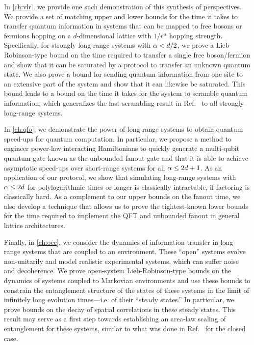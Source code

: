 In \cref{ch:vlr}, we provide one such demonstration of this synthesis of perspectives. We provide a set of matching upper and lower bounds for the time it takes to transfer quantum information in systems that can be mapped to free bosons or fermions hopping on a $d$-dimensional lattice with $1/r^{\alpha}$ hopping strength. Specifically, for strongly long-range systems with $\alpha < d/2$, we prove a Lieb-Robinson-type bound on the time required to transfer a single free boson/fermion and show that it can be saturated by a protocol to transfer an unknown quantum state. We also prove a bound for sending quantum information from one site to an extensive part of the system and show that it can likewise be saturated. This bound leads to a bound on the time it takes for the system to scramble quantum information, which generalizes the fast-scrambling result in Ref.~\cite{Lashkari2013} to all strongly long-range systems.

In \cref{ch:qfo}, we demonstrate the power of long-range systems to obtain quantum speed-ups for quantum computation. In particular, we propose a method to engineer power-law interacting Hamiltonians to quickly generate a multi-qubit quantum gate known as the unbounded fanout gate and that it is able to achieve asymptotic speed-ups over short-range systems for all $\alpha \le 2d+1$. As an application of our protocol, we show that simulating long-range systems with $\alpha \le 2d$ for polylogarithmic times or longer is classically intractable, if factoring is classically hard. As a complement to our upper bounds on the fanout time, we also develop a technique that allows us to prove the tightest-known lower bounds for the time required to implement the QFT and unbounded fanout in general lattice architectures.

Finally, in \cref{ch:occ}, we consider the dynamics of information transfer in long-range systems that are coupled to an environment. These ``open'' systems evolve non-unitarily and model realistic experimental systems, which can suffer noise and decoherence.
We prove open-system Lieb-Robinson-type bounds on the dynamics of systems coupled to Markovian environments and use these bounds to constrain the entanglement structure of the states of these systems in the limit of infinitely long evolution times---i.e. of their ``steady states.'' In particular, we prove bounds on the decay of spatial correlations in these steady states. This result may serve as a first step towards establishing an area-law scaling of entanglement for these systems, similar to what was done in Ref.~\cite{Gong2017} for the closed case. %

